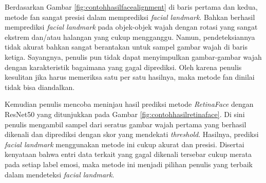 Berdasarkan Gambar \ref{fig:contohhasilfacealignment} di baris pertama dan kedua, metode \acrshort{fan} sangat presisi dalam memprediksi \textit{facial landmark}. Bahkan berhasil memprediksi \textit{facial landmark} pada objek-objek wajah dengan rotasi yang sangat ekstrem dan/atau halangan yang cukup mengganggu. Namun, pendeteksiannya tidak akurat bahkan sangat berantakan untuk sampel gambar wajah di baris ketiga. Sayangnya, penulis pun tidak dapat menyimpulkan gambar-gambar wajah dengan karakteristik bagaimana yang gagal diprediksi. Oleh karena penulis kesulitan jika harus memeriksa satu per satu hasilnya, maka metode \acrshort{fan} dinilai tidak bisa diandalkan.

Kemudian penulis mencoba meninjau hasil prediksi metode \textit{RetinaFace} dengan ResNet50 yang ditunjukkan pada Gambar \ref{fig:contohhasilretinaface}. Di sini penulis mengambil sampel dari seratus gambar wajah pertama yang berhasil dikenali dan diprediksi dengan skor yang mendekati \textit{threshold}. Hasilnya, prediksi \textit{facial landmark} menggunakan metode ini cukup akurat dan presisi. Disertai kenyataan bahwa entri data terkait yang gagal dikenali tersebar cukup merata pada setiap label emosi, maka metode ini menjadi pilihan penulis yang terbaik dalam mendeteksi \textit{facial landmark}.

